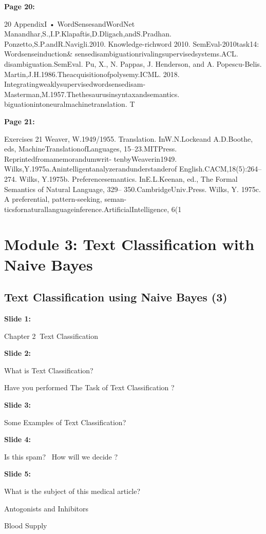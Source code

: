 \documentclass[11pt,a4paper]{article}
\begin{document}
\textbf{Page 20:}

20 AppendixI • WordSensesandWordNet
Manandhar,S.,I.P.Klapaftis,D.Dligach,andS.Pradhan. Ponzetto,S.P.andR.Navigli.2010. Knowledge-richword
2010. SemEval-2010task14: Wordsenseinduction& sensedisambiguationrivalingsupervisedsystems.ACL.
disambiguation.SemEval.
Pu, X., N. Pappas, J. Henderson, and A. Popescu-Belis.
Martin,J.H.1986.Theacquisitionofpolysemy.ICML. 2018. Integratingweaklysupervisedwordsensedisam-
Masterman,M.1957.Thethesaurusinsyntaxandsemantics. biguationintoneuralmachinetranslation. T

\textbf{Page 21:}

Exercises 21
Weaver, W.1949/1955. Translation. InW.N.Lockeand
A.D.Boothe, eds, MachineTranslationofLanguages,
15–23.MITPress. Reprintedfromamemorandumwrit-
tenbyWeaverin1949.
Wilks,Y.1975a.Anintelligentanalyzerandunderstanderof
English.CACM,18(5):264–274.
Wilks, Y.1975b. Preferencesemantics. InE.L.Keenan,
ed., The Formal Semantics of Natural Language, 329–
350.CambridgeUniv.Press.
Wilks, Y. 1975c. A preferential, pattern-seeking, seman-
ticsfornaturallanguageinference.ArtificialIntelligence,
6(1


\section{Module 3: Text Classification with Naive Bayes}


\subsection{Text Classification using Naive Bayes  (3)}

\textbf{Slide 1:}

Chapter 2Text Classification

\textbf{Slide 2:}

What is Text Classification?

Have you performed The Task of Text Classification ?

\textbf{Slide 3:}

Some Examples of Text Classification?

\textbf{Slide 4:}

Is this spam?  How will we decide ?

\textbf{Slide 5:}

What is the subject of this medical article?

Antogonists and Inhibitors

Blood Supply
\end{document}
